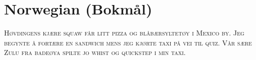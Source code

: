 

\presection\section*{\checkno Norwegian (Bokmål)}\postsection

\textsc{
Høvdingens kjære squaw får litt pizza og blåbærsyltetøy i Mexico by.
Jeg begynte å fortære en sandwich mens jeg kjørte taxi på vei til quiz.
Vår sære Zulu fra badeøya spilte jo whist og quickstep i min taxi.}